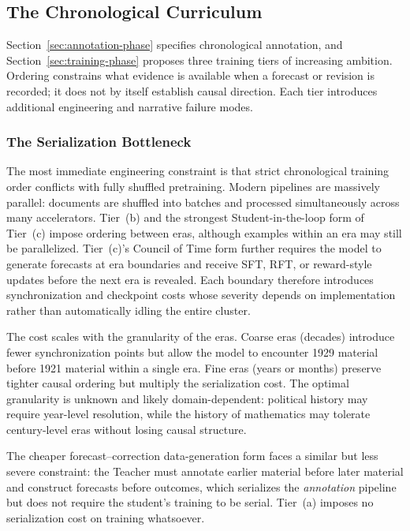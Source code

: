 \subsection{The Chronological Curriculum}\label{sec:limitations-chronological}

Section~\ref{sec:annotation-phase} specifies chronological annotation, and
Section~\ref{sec:training-phase} proposes three training tiers of increasing
ambition. Ordering constrains what evidence is available when a forecast or
revision is recorded; it does not by itself establish causal direction. Each
tier introduces additional engineering and narrative failure modes.

\subsubsection{The Serialization Bottleneck}

The most immediate engineering constraint is that strict chronological training
order conflicts with fully shuffled pretraining. Modern pipelines are massively
parallel: documents are shuffled into batches and processed simultaneously
across many accelerators. Tier~(b) and the strongest Student-in-the-loop form of
Tier~(c) impose ordering between eras, although examples within an era may still
be parallelized. Tier~(c)'s Council of Time form \cite{westerberg2026thl}
further requires the model to generate forecasts at era boundaries and receive
SFT, RFT, or reward-style updates before the next era is revealed. Each boundary
therefore introduces synchronization and checkpoint costs whose severity
depends on implementation rather than automatically idling the entire cluster.

The cost scales with the granularity of the eras. Coarse eras (decades) introduce fewer synchronization points but allow the model to encounter 1929 material before 1921 material within a single era. Fine eras (years or months) preserve tighter causal ordering but multiply the serialization cost. The optimal granularity is unknown and likely domain-dependent: political history may require year-level resolution, while the history of mathematics may tolerate century-level eras without losing causal structure.

The cheaper forecast--correction data-generation form faces a similar but less severe constraint: the Teacher must annotate earlier material before later material and construct forecasts before outcomes, which serializes the \emph{annotation} pipeline but does not require the student's training to be serial. Tier~(a) imposes no serialization cost on training whatsoever.

